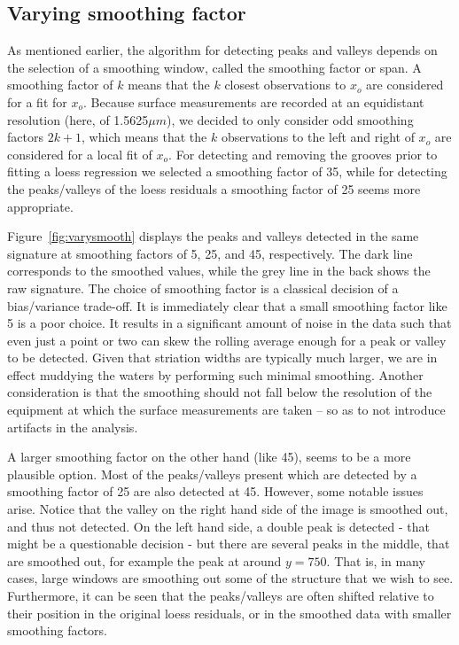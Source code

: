 \documentclass[aoas, preprint]{imsart}\usepackage[]{graphicx}\usepackage[]{color}
\begin{document}
\subsection{Varying smoothing factor}\label{sec:smoothing}
As mentioned earlier, the algorithm for detecting peaks and valleys depends on the selection of a smoothing window, called the smoothing factor or span. A smoothing factor of $k$ means that the  $k$ closest observations to $x_o$ are considered for a fit for $x_o$. Because surface measurements are recorded at an equidistant resolution (here, of 1.5625$\mu m$), we decided to only consider odd smoothing factors $2k + 1$, which means that the  $k$ observations to the left and right of $x_o$ are considered for a local fit of $x_o$. For detecting and removing the grooves prior to fitting a loess regression we selected a smoothing factor  of 35, while for detecting the peaks/valleys of the loess residuals a smoothing factor of 25 seems more appropriate. %

Figure~\ref{fig:varysmooth} displays the  peaks and valleys detected in the same signature at smoothing factors of 5, 25, and 45, respectively. The dark line corresponds to the smoothed values, while the grey line in the back shows the raw signature. The choice of smoothing factor is a classical decision of a bias/variance trade-off. It is immediately clear that a small smoothing factor like 5 is a poor choice. It results in a significant amount of noise in the data such that even just a point or two can skew the rolling average enough for a peak or valley to be detected. Given that striation widths are typically much larger, we are in effect muddying the waters by performing such minimal smoothing. Another consideration is that the smoothing should not fall below the  resolution of the equipment at which the surface measurements are taken -- so as to not introduce artifacts in the analysis. 

A larger smoothing factor on the other hand (like 45), seems to be a more plausible option. Most of the peaks/valleys present which are detected by a smoothing factor of 25 are also detected at 45. However, some notable issues arise. Notice that the valley on the right hand side of the image is smoothed out, and thus not detected. On the left hand side, a double peak is detected - that might be a questionable decision - but there are several peaks in the middle, that are smoothed out, for example the peak at around $y = 750$. That is, in many cases, large windows are smoothing out some of the structure that we wish to see. Furthermore, it can be seen that the peaks/valleys are often shifted relative to their position in the original loess residuals, or in the smoothed data with smaller smoothing factors.
\end{document}

